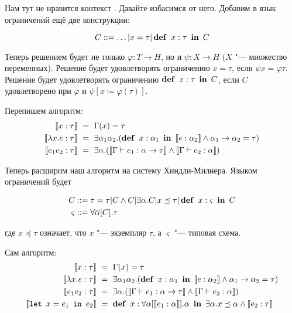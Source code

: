 Нам тут не нравится контекст \todo. Давайте избасимся от него.
Добавим в язык ограничений ещё две конструкции:
\begin{bnf}
\[
    C ::= \ldots | x = \tau | \mathinner\mathbf{def}~x : \tau~\mathinner\mathbf{in}~C
\]
\end{bnf}%
Теперь решением будет не только $\varphi : T \rightarrow H$, но и $\psi : X \rightarrow H$ ($X$ "--- множество переменных).
Решение будет удовлетворять ограничению $x = \tau$, если $\psi x = \varphi \tau$.
Решение будет удовлетворять ограничению $\mathinner\mathbf{def}~x:\tau~\mathinner\mathbf{in}~C$, если $C$ удовлетворено при $\varphi$ и $\psi[x \coloneqq \varphi(\tau)]$.

Перепишем алгоритм:
\begin{align*}
    \restr{x : \tau} \ &=\  \Gamma(x) = \tau \\
    \restr{\lambda x . e : \tau} \ &=\ 
        \exists \alpha_1 \alpha_2 . (\deff{x : \alpha_1}{\restr{e:\alpha_2}} \land \alpha_1\rightarrow\alpha_2=\tau) \\
    \restr{e_1 e_2 : \tau} \ &=\ 
        \exists\alpha.(\restr{\Gamma\vdash e_1 :\alpha\rightarrow\tau} \land \restr{\Gamma\vdash e_2 : \alpha})
\end{align*}

Теперь расширим наш алгоритм на систему Хиндли-Милнера. Языком ограничений будет
\begin{bnf}
\begin{align*}
    C &::= \tau = \tau | C \land C | \exists \alpha . C | x \preceq \tau | \mathinner\mathbf{def}~x : \varsigma~\mathinner\mathbf{in}~C \\
    \varsigma &::= \forall \overline\alpha[C] . \tau
\end{align*}
\end{bnf}%
где $x \preceq \tau$ означает, что $x$ "--- экземпляр $\tau$, а $\varsigma$ "--- типовая схема.

Сам алгоритм:
\begin{align*}
    \restr{x : \tau} \ &=\  \Gamma(x) = \tau \\
    \restr{\lambda x . e : \tau} \ &=\ 
        \exists \alpha_1 \alpha_2 . (\deff{x : \alpha_1}{\restr{e:\alpha_2}} \land \alpha_1\rightarrow\alpha_2=\tau) \\
    \restr{e_1 e_2 : \tau} \ &=\ 
        \exists\alpha.(\restr{\Gamma\vdash e_1 :\alpha\rightarrow\tau} \land \restr{\Gamma\vdash e_2 : \alpha}) \\
    \restr{\lett{x = e_1}{e_2}} \ &=\ \deff{x : \forall \alpha[\restr{e_1 : \alpha}].\alpha}
        {\exists \alpha . x \preceq \alpha \land \restr{e_2:\tau}}
\end{align*}
\todo

